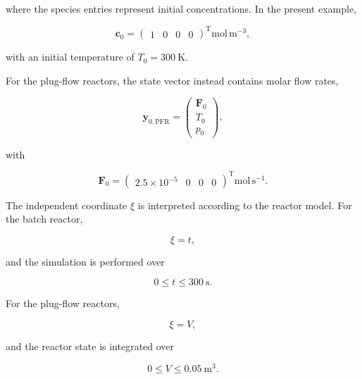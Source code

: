 where the species entries represent initial concentrations. In the present
example,

\begin{equation}
    \mathbf{c}_0
    =
    \begin{pmatrix}
        1 & 0 & 0 & 0
    \end{pmatrix}^{\mathrm{T}}
    \mathrm{mol\,m^{-3}},
\end{equation}

with an initial temperature of $T_0 = 300~\mathrm{K}$.

For the plug-flow reactors, the state vector instead contains molar flow rates,

\begin{equation}
    \mathbf{y}_{0,\mathrm{PFR}}
    =
    \begin{pmatrix}
        \mathbf{F}_0 \\
        T_0 \\
        p_0
    \end{pmatrix},
\end{equation}

with

\begin{equation}
    \mathbf{F}_0
    =
    \begin{pmatrix}
        2.5\times10^{-5} & 0 & 0 & 0
    \end{pmatrix}^{\mathrm{T}}
    \mathrm{mol\,s^{-1}}.
\end{equation}

The independent coordinate $\xi$ is interpreted according to the reactor
model. For the batch reactor,

\begin{equation}
    \xi = t,
\end{equation}

and the simulation is performed over

\begin{equation}
    0 \leq t \leq 300~\mathrm{s}.
\end{equation}

For the plug-flow reactors,

\begin{equation}
    \xi = V,
\end{equation}

and the reactor state is integrated over

\begin{equation}
    0 \leq V \leq 0.05~\mathrm{m^3}.
\end{equation}


